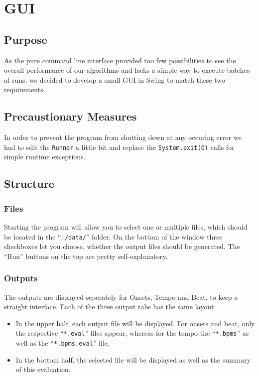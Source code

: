 \chapter{GUI} \label{cpt:gui}

\section{Purpose}
As the pure command line interface provided too few possibilities to see the
overall performance of our algorithms and lacks a simple way to execute
batches of runs, we decided to develop a small GUI in Swing to match these two
requirements.

\section{Precaustionary Measures}
In order to prevent the program from shutting down at any occuring error we had
to edit the \texttt{Runner} a little bit and replace the
\texttt{System.exit(0)} calls for simple runtime exceptions.

\section{Structure}
\subsection{Files}
Starting the program will allow you to select one or multiple files, which
should be located in the ``\texttt{./data/}'' folder. On the bottom of the
window three checkboxes let you choose, whether the output files should be
generated. The ``Run'' buttons on the top are pretty self-explanatory.

\subsection{Outputs}
The outputs are displayed seperately for Onsets, Tempo and Beat, to keep a
straight interface. Each of the three output tabs has the same layout:

\begin{itemize}
  \item In the upper half, each output file will be displayed. For onsets and
  beat, only the respective ``\texttt{*.eval}'' files appear, whereas for the
  tempo the ``\texttt{*.bpms}'' as well as the ``\texttt{*.bpms.eval}'' file.
  \item In the bottom half, the selected file will be displayed as well as the
  summary of this evaluation.
\end{itemize}
